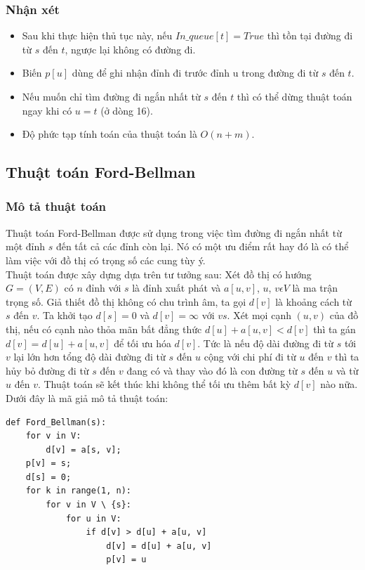 \documentclass[a4paper,12pt]{report}
\begin{document}
    \subsubsection{Nhận xét}
	\begin{itemize}
		\item Sau khi thực hiện thủ tục này, nếu $ In\_queue[t] = True $ thì tồn tại đường đi từ $s$ đến $t$, ngược lại không có đường đi.
		\item Biến $ p[u] $ dùng để ghi nhận đỉnh đi trước đỉnh u trong đường đi từ $s$ đến $t$.
                \item Nếu muốn chỉ tìm đường đi ngắn nhất từ $s$ đến $t$ thì có
                    thể dừng thuật toán ngay khi có $u = t$ (ở dòng 16).
		\item Độ phức tạp tính toán của thuật toán là $ O(n+m) $.

	\end{itemize}

\subsection{Thuật toán Ford-Bellman}
    \subsubsection{Mô tả thuật toán}
	Thuật toán Ford-Bellman được sử dụng trong việc tìm đường đi ngắn nhất từ một đỉnh $s$ đến tất cả các đỉnh còn lại. Nó có một ưu điểm rất hay đó là có thể làm việc với đồ thị có trọng số các cung tùy ý.\\
	Thuật toán được xây dựng dựa trên tư tưởng sau: Xét đồ thị có hướng $ G = (V, E) $ có $n$ đỉnh với $s$ là đỉnh xuất phát và $ a[u, v] $, $u$, $ v \epsilon V $ là ma trận trọng số. Giả thiết đồ thị không có chu trình âm, ta gọi $ d[v] $ là khoảng cách từ $s$ đến $v$. Ta khởi tạo $ d[s] = 0 $ và $ d[v] = \infty $ với $ v  s $. Xét mọi cạnh $ (u, v) $ của đồ thị, nếu có cạnh nào thỏa mãn bất đẳng thức $ d[u] + a[u, v] < d[v] $ thì ta gán $ d[v] = d[u] + a[u, v] $ để tối ưu hóa $ d[v] $. Tức là nếu độ dài đường đi từ $s$ tới $v$ lại lớn hơn tổng độ dài đường đi từ $s$ đến $u$ cộng với chi phí đi từ $u$ đến $v$ thì ta hủy bỏ đường đi từ $s$ đến $v$ đang có và thay vào đó là con đường từ $s$ đến $u$ và từ $u$ đến $v$. Thuật toán sẽ kết thúc khi không thể tối ưu thêm bất kỳ $d[v]$ nào nữa. Dưới đây là mã giả mô tả thuật toán:\\

\begin{verbatim}	
def Ford_Bellman(s):
    for v in V:
        d[v] = a[s, v];
	p[v] = s;
    d[s] = 0;
    for k in range(1, n):
        for v in V \ {s}:
            for u in V:
                if d[v] > d[u] + a[u, v]
                    d[v] = d[u] + a[u, v]
                    p[v] = u
\end{verbatim}
\end{document}
